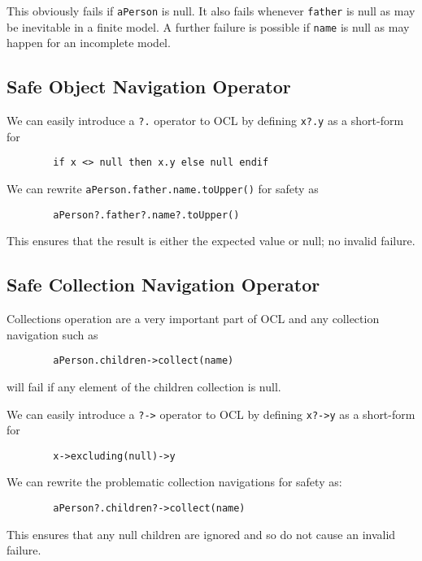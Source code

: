 \documentclass{llncs}
\begin{document}
This obviously fails if \verb|aPerson| is null. It also fails whenever \verb|father| is null as may be inevitable in a finite model. A further failure is possible if \verb|name| is null as may happen for an incomplete model.

\subsection{Safe Object Navigation Operator}

We can easily introduce a \verb|?.| operator to OCL by defining \verb|x?.y| as a short-form for 

\begin{verbatim}
        if x <> null then x.y else null endif
\end{verbatim}

We can rewrite \verb|aPerson.father.name.toUpper()| for safety as

\begin{verbatim}
        aPerson?.father?.name?.toUpper()
\end{verbatim}

This ensures that the result is either the expected value or null; no invalid failure.

\subsection{Safe Collection Navigation Operator}

Collections operation are a very important part of OCL and any collection navigation such as 
\begin{verbatim}
        aPerson.children->collect(name)
\end{verbatim}
will fail if any element of the children collection is null.

We can easily introduce a \verb|?->| operator to OCL by defining \verb|x?->y| as a short-form for 

\begin{verbatim}
        x->excluding(null)->y
\end{verbatim}

We can rewrite the problematic collection navigations for safety as:

\begin{verbatim}
        aPerson?.children?->collect(name)
\end{verbatim}

This ensures that any null children are ignored and so do not cause an invalid failure.
\end{document}
